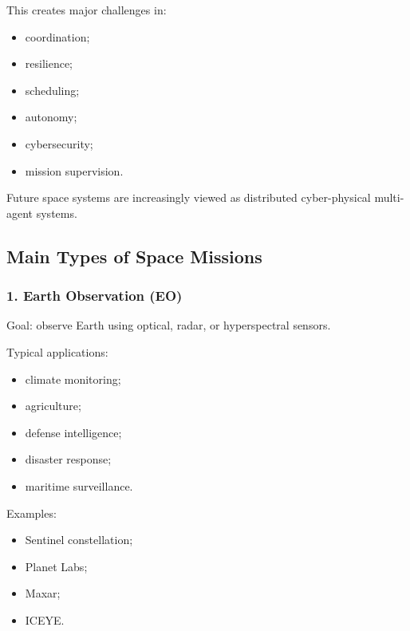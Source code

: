\documentclass[10pt,a4paper,twocolumn]{article}
\begin{document}
This creates major challenges in:
\begin{itemize}
    \item coordination;
    \item resilience;
    \item scheduling;
    \item autonomy;
    \item cybersecurity;
    \item mission supervision.
\end{itemize}

\begin{keybox}
    Future space systems are increasingly viewed as distributed cyber-physical multi-agent systems.
\end{keybox}


\subsection{Main Types of Space Missions}

\subsubsection*{1. Earth Observation (EO)}

Goal:
observe Earth using optical, radar, or hyperspectral sensors.

Typical applications:
\begin{itemize}
    \item climate monitoring;
    \item agriculture;
    \item defense intelligence;
    \item disaster response;
    \item maritime surveillance.
\end{itemize}

Examples:
\begin{itemize}
    \item Sentinel constellation;
    \item Planet Labs;
    \item Maxar;
    \item ICEYE.
\end{itemize}
\end{document}
